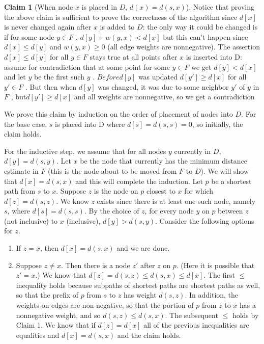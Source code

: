 \documentclass [12pt]{article}
\theoremstyle{definition}
\newtheorem{claim}{Claim}
\begin{document}
\begin{claim}[When node $x$ is placed in $D$, $d(x) = d(s,x)$] 
\vspace{1em}

Notice that proving the above claim is sufficient to prove the correctness of the algorithm since $d[x]$ is never changed again after $x$ is added to $D$: the only way it could be changed is if for some node $y \in F$ , $d[y] + w(y, x) < d[x]$ but this can’t happen since $d[x] \leq d[y ]$ and $w(y, x) \geq 0$ (all edge weights are nonnegative). The assertion $d[x] \leq d[y]$ for all $y \in F$ stays true at all points after $x$ is inserted into D: assume for contradiction that at some point for some $y \in F$ we get $d[y ] < d[x]$ and let $y$ be the first such $y$ . $Before d[y ]$ was updated $d[y' ] \geq d[x]$ for all $y' \in F$ . But then when $d[y ]$ was changed, it was due to some neighbor $y'$ of $y$ in $F$ , but$ d[y' ] \geq d[x]$ and all weights are nonnegative, so we get a contradiction 

We prove this claim by induction on the order of placement of nodes into $D$. For the base case, $s$ is placed into D where $d[s] = d(s, s) = 0$, so initially, the claim holds. 

For the inductive step, we assume that for all nodes $y$ currently in $D$, $d[y ] = d(s, y )$. Let $x$ be the node that currently has the minimum distance estimate in $F$ (this is the node about to be moved from $F$ to $D$). We will show that $d[x] = d(s, x)$ and this will complete the induction. Let $p$ be a shortest path from $s$ to $x$. Suppose $z$ is the node on $p$ closest to $x$ for which $d[z] = d(s, z)$. We know $z$ exists since there is at least one such node, namely $s$, where $d[s] = d(s, s)$. By the choice of $z$, for every node $y$ on $p$ between $z$ (not inclusive) to $x$ (inclusive), $d[y ] > d(s, y )$. Consider the following options for $z$.

\begin{enumerate} 
    \item If $z = x$, then $d[x] = d(s, x)$ and we are done.
    \item Suppose $z \neq x$. Then there is a node $z'$ after $z$ on $p$. (Here it is possible that $z' = x$.) We know that $d[z] = d(s, z) \leq d(s, x) \leq d[x]$. The first $\leq$ inequality holds because subpaths of shortest paths are shortest paths as well, so that the prefix of $p$ from $s$ to $z$ has weight $d(s, z)$. In addition, the weights on edges are non-negative, so that the portion of $ p$ from $z$ to $x$ has a nonnegative weight, and so $d(s, z) \leq d(s, x)$. The subsequent $\leq $ holds by Claim 1. We know that if $d[z] = d[x]$ all of the previous inequalities are equalities and $d[x] = d(s, x)$ and the claim holds. 


\end{enumerate}
\end{claim}
\end{document}
